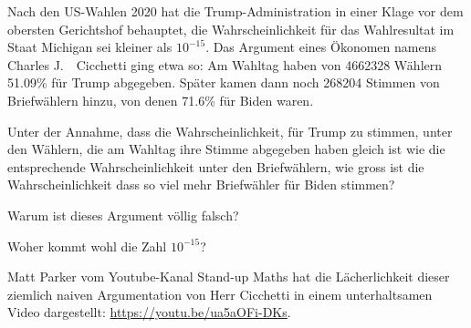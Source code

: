 Nach den US-Wahlen 2020 hat die Trump-Administration in einer Klage vor
dem obersten Gerichtshof behauptet, die Wahrscheinlichkeit für das 
Wahlresultat im Staat Michigan sei kleiner als $10^{-15}$.
Das Argument eines Ökonomen namens Charles J.~ Cicchetti ging etwa so:
Am Wahltag haben von 4662328 Wählern 51.09\% für Trump abgegeben.
Später kamen dann noch 268204 Stimmen von Briefwählern hinzu, von denen 
71.6\% für Biden waren.

\begin{teilaufgaben}
\item
Unter der Annahme, dass die Wahrscheinlichkeit, für Trump zu stimmen, unter
den Wählern, die am Wahltag ihre Stimme abgegeben haben gleich ist wie
die entsprechende Wahrscheinlichkeit unter den Briefwählern, wie gross
ist die Wahrscheinlichkeit dass so viel mehr Briefwähler für Biden stimmen?
\item
Warum ist dieses Argument völlig falsch?
\item
Woher kommt wohl die Zahl $10^{-15}$?
\end{teilaufgaben}

Matt Parker vom Youtube-Kanal Stand-up Maths hat die Lächerlichkeit
dieser ziemlich naiven Argumentation von Herr Cicchetti in einem
unterhaltsamen Video dargestellt: \url{https://youtu.be/ua5aOFi-DKs}.

